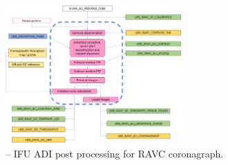 \begin{figure}[hb]
  \centering
  \includegraphics[width=0.6\textwidth]{./figures/metis_ifu_adi_ravc}
  \caption[Recipe: ]{ -- IFU ADI post processing for RAVC coronagraph.
    }
  \label{fig:metis_ifu_adi_ravc}
\end{figure}

